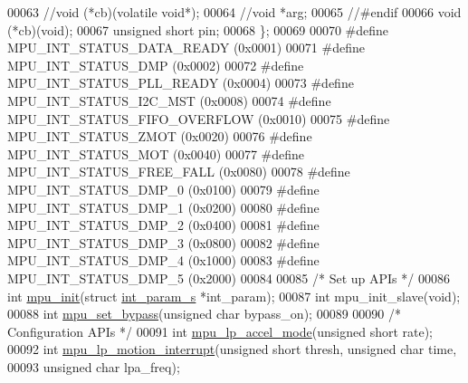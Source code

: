\begin{DoxyCode}
00063     \textcolor{comment}{//void (*cb)(volatile void*);}
00064     \textcolor{comment}{//void *arg;    }
00065 \textcolor{comment}{//#endif}
00066     void (*cb)(void);
00067     \textcolor{keywordtype}{unsigned} \textcolor{keywordtype}{short} pin;
00068 \};
00069 
00070 \textcolor{preprocessor}{#define MPU\_INT\_STATUS\_DATA\_READY       (0x0001)}
00071 \textcolor{preprocessor}{#define MPU\_INT\_STATUS\_DMP              (0x0002)}
00072 \textcolor{preprocessor}{#define MPU\_INT\_STATUS\_PLL\_READY        (0x0004)}
00073 \textcolor{preprocessor}{#define MPU\_INT\_STATUS\_I2C\_MST          (0x0008)}
00074 \textcolor{preprocessor}{#define MPU\_INT\_STATUS\_FIFO\_OVERFLOW    (0x0010)}
00075 \textcolor{preprocessor}{#define MPU\_INT\_STATUS\_ZMOT             (0x0020)}
00076 \textcolor{preprocessor}{#define MPU\_INT\_STATUS\_MOT              (0x0040)}
00077 \textcolor{preprocessor}{#define MPU\_INT\_STATUS\_FREE\_FALL        (0x0080)}
00078 \textcolor{preprocessor}{#define MPU\_INT\_STATUS\_DMP\_0            (0x0100)}
00079 \textcolor{preprocessor}{#define MPU\_INT\_STATUS\_DMP\_1            (0x0200)}
00080 \textcolor{preprocessor}{#define MPU\_INT\_STATUS\_DMP\_2            (0x0400)}
00081 \textcolor{preprocessor}{#define MPU\_INT\_STATUS\_DMP\_3            (0x0800)}
00082 \textcolor{preprocessor}{#define MPU\_INT\_STATUS\_DMP\_4            (0x1000)}
00083 \textcolor{preprocessor}{#define MPU\_INT\_STATUS\_DMP\_5            (0x2000)}
00084 
00085 \textcolor{comment}{/* Set up APIs */}
00086 \textcolor{keywordtype}{int} \hyperlink{group___d_r_i_v_e_r_s_ga63637cf3771995aeda99d91d5f345f29}{mpu\_init}(\textcolor{keyword}{struct} \hyperlink{structint__param__s}{int\_param\_s} *int\_param);
00087 \textcolor{keywordtype}{int} mpu\_init\_slave(\textcolor{keywordtype}{void});
00088 \textcolor{keywordtype}{int} \hyperlink{group___d_r_i_v_e_r_s_ga36f70f38371b48d81094d3b061233e15}{mpu\_set\_bypass}(\textcolor{keywordtype}{unsigned} \textcolor{keywordtype}{char} bypass\_on);
00089 
00090 \textcolor{comment}{/* Configuration APIs */}
00091 \textcolor{keywordtype}{int} \hyperlink{group___d_r_i_v_e_r_s_gabdcf10922a1a20f1b5bbd7576d3189b9}{mpu\_lp\_accel\_mode}(\textcolor{keywordtype}{unsigned} \textcolor{keywordtype}{short} rate);
00092 \textcolor{keywordtype}{int} \hyperlink{group___d_r_i_v_e_r_s_ga7d0b3259346898ccd1ba6ef78bf7df97}{mpu\_lp\_motion\_interrupt}(\textcolor{keywordtype}{unsigned} \textcolor{keywordtype}{short} thresh, \textcolor{keywordtype}{unsigned} \textcolor{keywordtype}{char} time,
00093     \textcolor{keywordtype}{unsigned} \textcolor{keywordtype}{char} lpa\_freq);

\end{DoxyCode}
